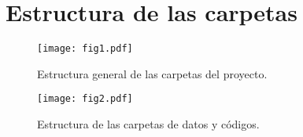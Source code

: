 \documentclass[11pt,en]{elegantpaper}
\begin{document}
\section{Estructura de las carpetas}
\label{sec:appendix}
\begin{figure}[htbp]
	\centering
	\caption{Estructura general de las carpetas del proyecto.\label{fig:carpetas}}
	\texttt{[image: fig1.pdf]}
\end{figure}


\begin{figure}[htbp]
	\centering
	\caption{Estructura de las carpetas de datos y códigos. \label{fig:code}}
	\texttt{[image: fig2.pdf]}
\end{figure}

\end{document}
